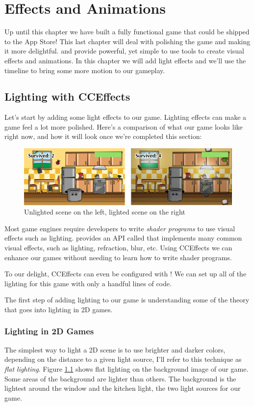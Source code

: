 \chapter{Effects and Animations}

Up until this chapter we have built a fully functional game that could be
shipped to the App Store! This last chapter will deal with polishing the game and making
it more delightful. \SB{} and \cocos{} provide powerful, yet simple to use tools
to create visual effects and animations. In this chapter we will add light
effects and we'll use the \SB{} timeline to bring some more motion to our
gameplay.

\section{Lighting with CCEffects}
Let's start by adding some light effects to our game. Lighting effects can make
a game feel a lot more polished. Here's a comparison of what our game looks like
right now, and how it will look once we're completed this section:

\begin{figure}[H]
    \centering
    \includegraphics[width=0.9\linewidth]{images/Chapter9/lighting_comparison.png}
    \caption{Unlighted scene on the left, lighted scene on the right}
    \label{lighting_example}
\end{figure}

Most game engines require developers to write \textit{shader programs} to
use visual effects such as lighting. \cocos{} provides an API called
 that implements many common visual effects, such as
lighting, refraction, blur, etc. Using CCEffects we can enhance our games
without needing to learn how to write shader programs. 

To our delight, CCEffects can even be configured with \SB{}! We can set up all
of the lighting for this game with only a handful lines of code. 

The first step of adding lighting to our game is understanding some of the
theory that goes into lighting in 2D games.

\subsection{Lighting in 2D Games}
The simplest way to light a 2D scene is to use brighter and darker colors,
depending on the distance to a given light source, I'll refer to this technique
as \textit{flat lighting}. Figure \ref{lighting_example} shows flat lighting on
the background image of our game. Some areas of the background are lighter than
others. The background is the lightest around the window and the kitchen light,
the two light sources for our game.

